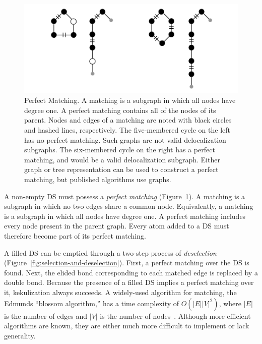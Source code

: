 \documentclass{article}
\begin{document}
\begin{figure}
    \centering
    \includegraphics[width=\columnwidth]{matching.pdf}
    \caption{Perfect Matching. A matching is a subgraph in which all nodes have degree one. A perfect matching contains all of the nodes of its parent. Nodes and edges of a matching are noted with black circles and hashed lines, respectively. The five-membered cycle on the left has no perfect matching. Such graphs are not valid delocalization subgraphs. The six-membered cycle on the right has a perfect matching, and would be a valid delocalization subgraph. Either graph or tree representation can be used to construct a perfect matching, but published algorithms use graphs.}
    \label{fig:perfect-matching}
\end{figure}

A non-empty DS must possess a \textit{perfect matching} (Figure~\ref{fig:perfect-matching}). A matching is a subgraph in which no two edges share a common node. Equivalently, a matching is a subgraph in which all nodes have degree one. A perfect matching includes every node present in the parent graph. Every atom added to a DS must therefore become part of its perfect matching.

A filled DS can be emptied through a two-step process of \textit{deselection} (Figure~\ref{fig:selection-and-deselection}). First, a perfect matching over the DS is found. Next, the elided bond corresponding to each matched edge is replaced by a double bond. Because the presence of a filled DS implies a perfect matching over it, kekulization always succeeds. A widely-used algorithm for matching, the Edmunds \enquote{blossom algorithm,} has a time complexity of $O(|E||V|^2)$, where $|E|$ is the number of edges and $|V|$ is the number of nodes~\cite{edmonds:1965}. Although more efficient algorithms are known, they are either much more difficult to implement or lack generality.
\end{document}
